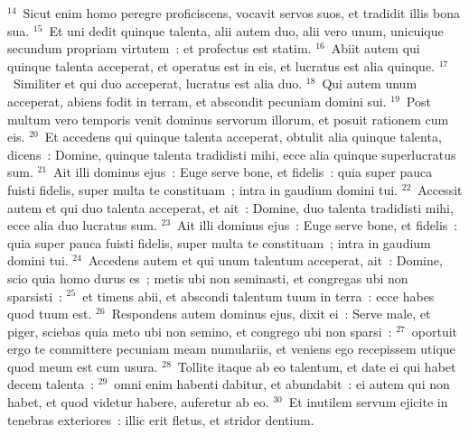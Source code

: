 ${}^{14}$~Sicut enim homo peregre proficiscens, vocavit servos suos, et tradidit illis bona sua.
${}^{15}$~Et uni dedit quinque talenta, alii autem duo, alii vero unum, unicuique secundum propriam virtutem~: et profectus est statim.
${}^{16}$~Abiit autem qui quinque talenta acceperat, et operatus est in eis, et lucratus est alia quinque.
${}^{17}$~Similiter et qui duo acceperat, lucratus est alia duo.
${}^{18}$~Qui autem unum acceperat, abiens fodit in terram, et abscondit pecuniam domini sui.
${}^{19}$~Post multum vero temporis venit dominus servorum illorum, et posuit rationem cum eis.
${}^{20}$~Et accedens qui quinque talenta acceperat, obtulit alia quinque talenta, dicens~: Domine, quinque talenta tradidisti mihi, ecce alia quinque superlucratus sum.
${}^{21}$~Ait illi dominus ejus~: Euge serve bone, et fidelis~: quia super pauca fuisti fidelis, super multa te constituam~; intra in gaudium domini tui.
${}^{22}$~Accessit autem et qui duo talenta acceperat, et ait~: Domine, duo talenta tradidisti mihi, ecce alia duo lucratus sum.
${}^{23}$~Ait illi dominus ejus~: Euge serve bone, et fidelis~: quia super pauca fuisti fidelis, super multa te constituam~; intra in gaudium domini tui.
${}^{24}$~Accedens autem et qui unum talentum acceperat, ait~: Domine, scio quia homo durus es~; metis ubi non seminasti, et congregas ubi non sparsisti~:
${}^{25}$~et timens abii, et abscondi talentum tuum in terra~: ecce habes quod tuum est.
${}^{26}$~Respondens autem dominus ejus, dixit ei~: Serve male, et piger, sciebas quia meto ubi non semino, et congrego ubi non sparsi~:
${}^{27}$~oportuit ergo te committere pecuniam meam numulariis, et veniens ego recepissem utique quod meum est cum usura.
${}^{28}$~Tollite itaque ab eo talentum, et date ei qui habet decem talenta~:
${}^{29}$~omni enim habenti dabitur, et abundabit~: ei autem qui non habet, et quod videtur habere, auferetur ab eo.
${}^{30}$~Et inutilem servum ejicite in tenebras exteriores~: illic erit fletus, et stridor dentium.



